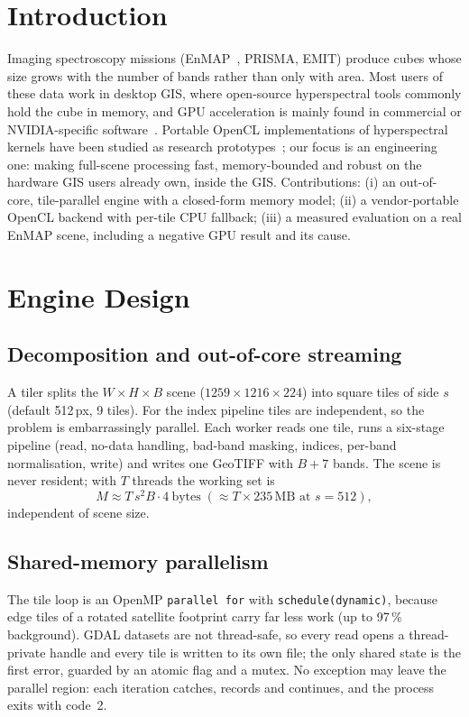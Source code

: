 \documentclass[conference]{IEEEtran}
\begin{document}
\section{Introduction}
Imaging spectroscopy missions (EnMAP~\cite{guanter2015enmap}, PRISMA, EMIT) produce cubes whose size
grows with the number of bands rather than only with area. Most users of
these data work in desktop GIS, where open-source hyperspectral tools commonly
hold the cube in memory, and GPU acceleration is mainly found in commercial or
NVIDIA-specific software~\cite{qu2013sam}. Portable OpenCL implementations of
hyperspectral kernels have been studied as research
prototypes~\cite{bernabe2019opencl}; our focus is an engineering one: making
full-scene processing fast, memory-bounded and robust on the hardware GIS users
already own, inside the GIS. Contributions:
(i) an out-of-core, tile-parallel engine with a closed-form memory model;
(ii) a vendor-portable OpenCL backend with per-tile CPU fallback;
(iii) a measured evaluation on a real EnMAP scene, including a negative GPU
result and its cause.

\section{Engine Design}
\subsection{Decomposition and out-of-core streaming}
A tiler splits the $W\times H\times B$ scene ($1259\times1216\times224$) into
square tiles of side $s$ (default 512\,px, 9 tiles). For the index pipeline
tiles are independent, so the problem is embarrassingly parallel. Each worker
reads one tile, runs a six-stage pipeline (read, no-data handling, bad-band
masking, indices, per-band normalisation, write) and writes one GeoTIFF with
$B+7$ bands. The scene is never resident; with $T$ threads the working set is
\begin{equation}
M \approx T\, s^{2} B \cdot 4\ \text{bytes} \;(\approx T\times 235\,\text{MB at } s=512),
\end{equation}
independent of scene size.

\subsection{Shared-memory parallelism}
The tile loop is an OpenMP \texttt{parallel for} with \texttt{schedule(dynamic)},
because edge tiles of a rotated satellite footprint carry far less work
(up to 97\,\% background). GDAL datasets are not thread-safe, so every read
opens a thread-private handle and every tile is written to its own file; the
only shared state is the first error, guarded by an atomic flag and a mutex.
No exception may leave the parallel region: each iteration catches, records
and continues, and the process exits with code~2.
\end{document}
